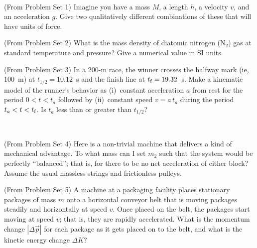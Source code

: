 \documentclass[12pt, letterpaper]{article}
\begin{document}
\vfill
~\clearpage

\begin{problem} (From Problem Set 1)
  Imagine you have a mass $M$, a length $h$, a velocity $v$, and an
  acceleration $g$. Give two qualitatively different combinations of these
  that will have units of force.
\end{problem}

\vfill

\begin{problem} (From Problem Set 2)
  What is the mass density of diatomic nitrogen ($\mathrm{N}_2$) gas at standard
  temperature and pressure? Give a numerical value in SI units.
\end{problem}

\vfill

\begin{problem} (From Problem Set 3)
  In a 200-m race, the winner crosses the halfway mark (ie, 100~m) at
  $t_{1/2}=10.12$~s and the finish line at $t_{\rm f}=19.32$~s.
  Make a kinematic model of the runner's behavior as (i)~constant
  acceleration $a$ from rest for the period $0<t<t_a$ followed by
  (ii)~constant speed $v=a\,t_a$ during the period $t_a<t<t_{\rm f}$.
  Is $t_a$ less than or greater than $t_{1/2}$?
\end{problem}

\vfill
~\clearpage

\begin{problem} (From Problem Set 4)
  Here is a non-trivial machine that delivers a kind of mechanical
  advantage. To what mass can I set $m_2$ such that the system would
  be perfectly ``balanced''; that is, for there to be no
  net acceleration of either block?
  Assume the usual massless strings and frictionless pulleys.
\end{problem}

\vfill

\begin{problem} (From Problem Set 5)
  A machine at a packaging facility places stationary packages of mass
  $m$ onto a horizontal conveyor belt that is moving packages steadily
  and horizontally at speed $v$. Once placed on the belt, the packages
  start moving at speed $v$; that is, they are rapidly accelerated.
  What is the momentum change $|\Delta \vec{p}|$ for each package as it
  gets placed on to the belt, and what is the kinetic energy change $\Delta K$?
\end{problem}
\end{document}
